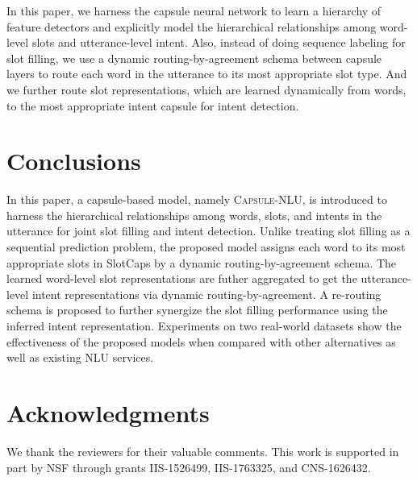 \documentclass[11pt,a4paper,hyphens]{article}
\newcommand{\ModelName}{{\textsc{Capsule-NLU}}}
\newcommand{\SecondCapsule}{SlotCaps}
\begin{document}
In this paper, we harness the capsule neural network to learn a hierarchy of feature detectors and explicitly model the hierarchical relationships among word-level slots and utterance-level intent. Also, instead of doing sequence labeling for slot filling, we use a dynamic routing-by-agreement schema between capsule layers to route each word in the utterance to its most appropriate slot type. And we further route slot representations, which are learned dynamically from words, to the most appropriate intent capsule for intent detection. \section{Conclusions}
In this paper, a capsule-based model, namely {\ModelName}, is introduced to harness the hierarchical relationships among words, slots, and intents in the utterance for joint slot filling and intent detection.
Unlike treating slot filling as a sequential prediction problem, the proposed model assigns each word to its most appropriate slots in {\SecondCapsule} by a dynamic routing-by-agreement schema. The learned word-level slot representations are futher aggregated to get the utterance-level intent representations via dynamic routing-by-agreement. A re-routing schema is proposed to further synergize the slot filling performance using the inferred intent representation.
Experiments on two real-world datasets show the effectiveness of the proposed models when compared with other alternatives as well as existing NLU services. \section{Acknowledgments}
We thank the reviewers for their valuable comments. This work is supported in part by NSF through grants IIS-1526499, IIS-1763325, and CNS-1626432. 

\balance
\end{document}
